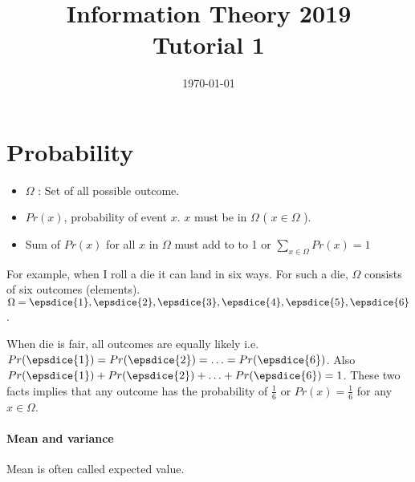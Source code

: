 \documentclass[a4paper,9pt, addpoints, solutions]{exam}
\title{Information Theory 2019 \\ Tutorial 1}
\date{\today}
\begin{document}
\maketitle

\section{Probability}
\begin{itemize}
    \item $\Omega$ : Set of all possible outcome.
    \item $Pr(x)$, probability of event $x$. $x$ must be in $\Omega$ ( $x \in \Omega$ ).
    \item  Sum of $Pr(x)$ for all $x$ in $\Omega$ must add to to 1 or $\sum_{x\in\Omega} Pr(x)= 1$
\end{itemize}

For example, when I roll a die it can land in six ways. For such a  die,
$\Omega$ consists of six outcomes (elements).  $\Omega={ \epsdice{1},
\epsdice{2}, \epsdice{3},\epsdice{4},\epsdice{5},\epsdice{6} }$. 

When die is fair, all outcomes are equally likely i.e. $Pr(\epsdice{1}) =
Pr(\epsdice{2}) = \ldots = Pr(\epsdice{6})$. Also $Pr(\epsdice{1}) +
Pr(\epsdice{2}) + \ldots + Pr(\epsdice{6}) = 1$. These two facts implies that
any outcome has the probability of $\frac{1}{6}$ or $Pr(x) = \frac{1}{6}$ for
any $x\in\Omega$.

\paragraph{Mean and variance}

Mean is often called expected value.
\end{document}
